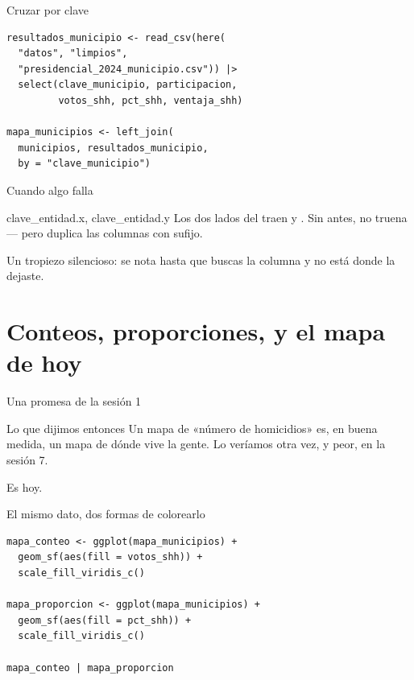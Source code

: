 \begin{frame}[fragile]{Cruzar por clave}
\begin{lstlisting}
resultados_municipio <- read_csv(here(
  "datos", "limpios",
  "presidencial_2024_municipio.csv")) |>
  select(clave_municipio, participacion,
         votos_shh, pct_shh, ventaja_shh)

mapa_municipios <- left_join(
  municipios, resultados_municipio,
  by = "clave_municipio")
\end{lstlisting}
\end{frame}

\begin{frame}{Cuando algo falla}
  \vspace{0.4em}
  \begin{errorbox}{clave\_entidad.x, clave\_entidad.y}
    Los dos lados del  traen 
    y . Sin  antes, no truena — pero
    duplica las columnas con sufijo.

    \vspace{0.5em}
    Un tropiezo silencioso: se nota hasta que buscas la columna y no
    está donde la dejaste.
  \end{errorbox}
\end{frame}

\section{Conteos, proporciones, y el mapa de hoy}

\begin{frame}{Una promesa de la sesión 1}
  \vspace{0.4em}
  \begin{block}{Lo que dijimos entonces}
    Un mapa de «número de homicidios» es, en buena medida, un mapa
    de dónde vive la gente. Lo veríamos otra vez, y peor, en la
    sesión 7.
  \end{block}

  \vspace{1.0em}
  {\small\color{grisTenue}Es hoy.}
\end{frame}

\begin{frame}[fragile]{El mismo dato, dos formas de colorearlo}
\begin{lstlisting}
mapa_conteo <- ggplot(mapa_municipios) +
  geom_sf(aes(fill = votos_shh)) +
  scale_fill_viridis_c()

mapa_proporcion <- ggplot(mapa_municipios) +
  geom_sf(aes(fill = pct_shh)) +
  scale_fill_viridis_c()

mapa_conteo | mapa_proporcion
\end{lstlisting}
\end{frame}

